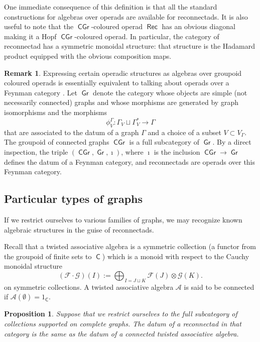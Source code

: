 \documentclass[11pt]{article}
\newtheorem{prop}[theo]{Proposition}
\theoremstyle{definition}
\newtheorem{rema}[theo]{Remark}
\numberwithin{equation}{section}
\newcommand{\calA}{\mathcal{A}}
\newcommand\calF{\mathcal{F}}
\newcommand\calG{\mathcal{G}}
\DeclareMathOperator{\sfC}{\mathsf{C}}
\DeclareMathOperator{\Gr}{\mathsf{Gr}}
\DeclareMathOperator{\CGr}{\mathsf{CGr}}
\DeclareMathOperator{\Rec}{\mathsf{Rec}}
\begin{document}
One immediate consequence of this definition is that all the standard constructions for algebras over operads are available for reconnectads. It is also useful to note that the $\CGr$-coloured operad $\Rec$ has an obvious diagonal making it a Hopf $\CGr$-coloured operad. In particular, the category of reconnectad has a symmetric monoidal structure: that structure is the Hadamard product equipped with the obvious composition maps.

\begin{rema}\label{rem:Feynman}
Expressing certain operadic structures as algebras over groupoid coloured operads is essentially equivalent to talking about operads over a Feynman category \cite{MR3636409}. Let $\Gr$ denote the category whose objects are simple (not necessarily connected) graphs and whose morphisms are generated by graph isomorphisms and the morphisms
 \[
\phi^\Gamma_V \colon \Gamma_V\sqcup\Gamma^*_V  \to \Gamma
 \]
that are associated to the datum of a graph $\Gamma$ and a choice of a subset $V\subset V_\Gamma$. The groupoid of connected graphs $\CGr$ is a full subcategory of $\Gr$. By a direct inspection, the triple $(\CGr,\Gr,\imath)$, where $\imath$ is the inclusion $\CGr\to\Gr$ defines the datum of a Feynman category, and reconnectads are operads over this Feynman category.  
\end{rema}

\subsection{Particular types of graphs}\label{sec:part-types}

If we restrict ourselves to various families of graphs, we may recognize known algebraic structures in the guise of reconnectads. 

Recall that a twisted associative algebra is a symmetric collection (a functor from the groupoid of finite sets to $\sfC$) which is a monoid with respect to the Cauchy monoidal structure 
 \[
(\calF\cdot\calG)(I):=\bigoplus_{I=J\sqcup K}\calF(J)\otimes\calG(K). 
 \]
on symmetric collections. A twisted associative algebra $\calA$ is said to be connected if $\calA(\emptyset)=1_{\sfC}$.

\begin{prop}\label{prop:LM}
Suppose that we restrict ourselves to the full subcategory of collections supported on complete graphs. The datum of a reconnectad in that category is the same as the datum of a connected twisted associative algebra.
\end{prop}
\end{document}
